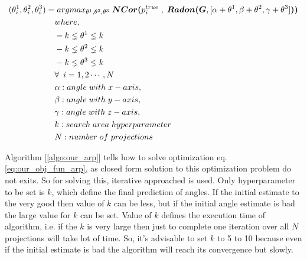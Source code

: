 \documentclass{report}
\begin{document}
\begin{equation}\label{eq:our_obj_fun_arp}
  \begin{aligned}
    (\theta^1_i,\theta^2_i,\theta^3_i)  = & \hspace{0.1cm} argmax_{\theta^1,\theta^2,\theta^3} \hspace{0.1cm} \boldsymbol{NCor(}  p_i^{true}\hspace{0.1cm} , \hspace{0.1cm} \boldsymbol{Radon(G}, [ \alpha+\theta^1,\beta+\theta^2,\gamma+\theta^3 ] \boldsymbol{)} \boldsymbol{)}\\
    & where,\\
    &  -k \lneq \theta^1 \lneq k\\
    &  -k \lneq \theta^2 \lneq k\\
    &  -k \lneq \theta^3 \lneq k\\
    &  \forall \enspace i = 1,2 \cdots , N\\
    & \alpha : angle\hspace{0.1cm}with\hspace{0.1cm}x-axis,\\
    & \beta : angle\hspace{0.1cm}with\hspace{0.1cm}y-axis,\\
    & \gamma : angle\hspace{0.1cm}with\hspace{0.1cm}z-axis,\\
    &  k : search\hspace{0.1cm}area\hspace{0.1cm}hyperparameter \\
    & N: number\hspace{0.1cm}of\hspace{0.1cm}projections\\
  \end{aligned}
\end{equation}

Algorithm [\ref{algo:our_arp}] tells how to solve optimization eq. \ref{eq:our_obj_fun_arp}, as closed form solution to this optimization problem do not exits. So for solving this, iterative approached is used. Only hyperparameter to be set is ${k}$, which define the final prediction of angles. If the initial estimate to the very good then value of ${k}$ can be less, but if the initial angle estimate is bad the large value  for ${k}$ can be set. Value of ${k}$ defines the execution time of algorithm, i.e. if the ${k}$ is very large then just to complete one iteration over all ${N}$ projections will take lot of time. So, it's advisable to set ${k}$ to 5 to 10 because even if the initial estimate is bad the algorithm will reach its convergence but slowly.\\ \\  
\end{document}
